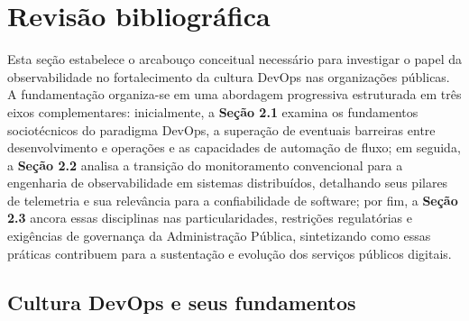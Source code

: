 \section{Revisão bibliográfica}\label{sec:revisao}

Esta seção estabelece o arcabouço conceitual necessário para investigar o papel da
observabilidade no fortalecimento da cultura DevOps nas organizações públicas. A
fundamentação organiza-se em uma abordagem progressiva estruturada em três eixos
complementares: inicialmente, a \textbf{Seção 2.1} examina os fundamentos sociotécnicos do
paradigma DevOps, a superação de eventuais barreiras entre desenvolvimento e operações e
as capacidades de automação de fluxo; em seguida, a \textbf{Seção 2.2} analisa a transição
do monitoramento convencional para a engenharia de observabilidade em sistemas
distribuídos, detalhando seus pilares de telemetria e sua relevância para a confiabilidade
de software; por fim, a \textbf{Seção 2.3} ancora essas disciplinas nas particularidades,
restrições regulatórias e exigências de governança da Administração Pública, sintetizando
como essas práticas contribuem para a sustentação e evolução dos serviços públicos
digitais.

\subsection{Cultura DevOps e seus fundamentos}\label{sec:devops}




